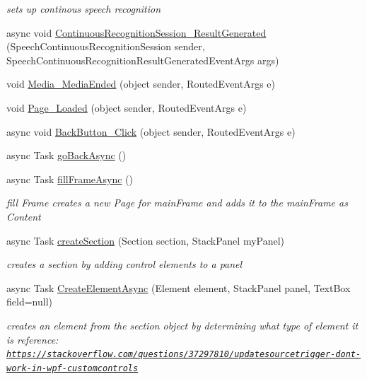 \begin{DoxyCompactItemize}
\begin{DoxyCompactList}\small\item\em sets up continous speech recognition \end{DoxyCompactList}\item 
async void \hyperlink{class_listen_to_me_1_1_main_page_afad060c55f3bedc7d8e499829e133c98}{Continuous\+Recognition\+Session\+\_\+\+Result\+Generated} (Speech\+Continuous\+Recognition\+Session sender, Speech\+Continuous\+Recognition\+Result\+Generated\+Event\+Args args)
\item 
void \hyperlink{class_listen_to_me_1_1_main_page_ab7c9aeb7a6b1053375754c58933360d6}{Media\+\_\+\+Media\+Ended} (object sender, Routed\+Event\+Args e)
\item 
void \hyperlink{class_listen_to_me_1_1_main_page_a9e7a645ae278f0e83ff9c3a831b37028}{Page\+\_\+\+Loaded} (object sender, Routed\+Event\+Args e)
\item 
async void \hyperlink{class_listen_to_me_1_1_main_page_ad477d18baff88094baa32ac20b462284}{Back\+Button\+\_\+\+Click} (object sender, Routed\+Event\+Args e)
\item 
async Task \hyperlink{class_listen_to_me_1_1_main_page_a1ccf14d59eabbcc4148cadd8dd11fc04}{go\+Back\+Async} ()
\item 
async Task \hyperlink{class_listen_to_me_1_1_main_page_a1a1e1d6e362134f6426bcf99ca83c45c}{fill\+Frame\+Async} ()
\begin{DoxyCompactList}\small\item\em fill Frame creates a new Page for main\+Frame and adds it to the main\+Frame as Content \end{DoxyCompactList}\item 
async Task \hyperlink{class_listen_to_me_1_1_main_page_a16241dfda10c37812bcb3a55a791e011}{create\+Section} (Section section, Stack\+Panel my\+Panel)
\begin{DoxyCompactList}\small\item\em creates a section by adding control elements to a panel \end{DoxyCompactList}\item 
async Task \hyperlink{class_listen_to_me_1_1_main_page_a73b3a3311149846cf028c5824dab2a6e}{Create\+Element\+Async} (Element element, Stack\+Panel panel, Text\+Box field=null)
\begin{DoxyCompactList}\small\item\em creates an element from the section object by determining what type of element it is reference\+: \href{https://stackoverflow.com/questions/37297810/updatesourcetrigger-dont-work-in-wpf-customcontrols}{\tt https\+://stackoverflow.\+com/questions/37297810/updatesourcetrigger-\/dont-\/work-\/in-\/wpf-\/customcontrols} \end{DoxyCompactList}\item 

\end{DoxyCompactItemize}
